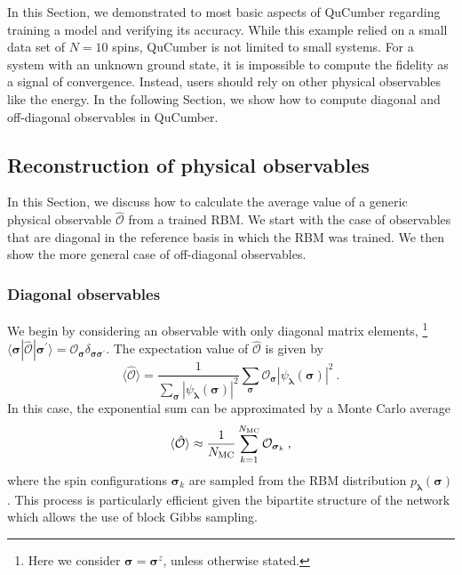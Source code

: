 \documentclass[submission, Phys, hidelnks]{SciPost}
\begin{document}
In this Section, we demonstrated to most basic aspects of QuCumber regarding training a model and verifying its accuracy. While this example relied on a small data set of $N=10$ spins, QuCumber is not limited to small systems. For a system with an unknown ground state, it is impossible to compute the fidelity as a signal of convergence. Instead, users should rely on other physical observables like the energy. In the following Section, we show how to compute diagonal and off-diagonal observables in QuCumber. 

\subsection{Reconstruction of physical observables} \label{Sec:Sampling_a-Trained_RBM}
In this Section, we discuss how to calculate the average value of a generic physical observable $\hat{\mathcal{O}}$ from a trained RBM. We start with the case of observables that are diagonal in the reference basis in which the RBM was trained. We then show the more general case of off-diagonal observables.

\subsubsection{Diagonal observables}
We begin by considering an observable with only diagonal matrix elements,
\footnote{
Here we consider $\bm{\sigma}=\bm{\sigma}^z$, unless otherwise stated.
} 
$\langle\bm{\sigma}|\hat{\mathcal{O}}|\bm{\sigma}^{\prime}\rangle=\mathcal{O}_{\bm{\sigma}}\delta_{\bm{\sigma\sigma}^\prime}$.
The expectation value of $\hat{\mathcal{O}}$ is given by
\begin{equation}
    \langle \hat{\mathcal{O}} \rangle = \frac{1}{\sum_{\bm{\sigma}} |\psi_{\bm{\lambda}}(\bm{\sigma})|^2}
    \sum_{\bm{\sigma}} \mathcal{O}_{\bm{\sigma}}|\psi_{\bm{\lambda}}(\bm{\sigma})|^2\:.
\end{equation}
In this case, the exponential sum can be approximated by a Monte Carlo average
\begin{equation}
    \langle \hat{\mathcal{O}}\rangle \approx \frac{1}{N_{\rm MC}} \sum_{k=1}^{N_{\rm MC}} \mathcal{O}_{\bm{\sigma}_k}\:,
\end{equation}
where the spin configurations $\bm{\sigma}_k$ are sampled from the RBM distribution $p_{\bm{\lambda}}(\bm{\sigma})$. This process is particularly efficient given the bipartite structure of the network which allows the use of block Gibbs sampling. 
\end{document}
